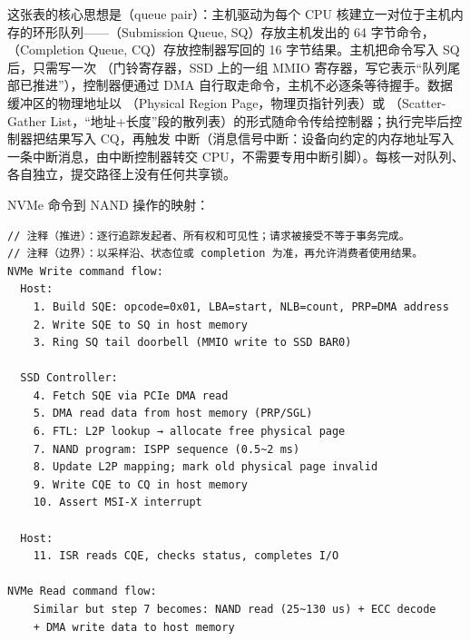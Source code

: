 这张表的核心思想是（queue pair）：主机驱动为每个 CPU 核建立一对位于主机内存的环形队列——（Submission Queue, SQ）存放主机发出的 64 字节命令，（Completion Queue, CQ）存放控制器写回的 16 字节结果。主机把命令写入 SQ 后，只需写一次 （门铃寄存器，SSD 上的一组 MMIO 寄存器，写它表示“队列尾部已推进”），控制器便通过 DMA 自行取走命令，主机不必逐条等待握手。数据缓冲区的物理地址以 （Physical Region Page，物理页指针列表）或 （Scatter-Gather List，“地址+长度”段的散列表）的形式随命令传给控制器；执行完毕后控制器把结果写入 CQ，再触发  中断（消息信号中断：设备向约定的内存地址写入一条中断消息，由中断控制器转交 CPU，不需要专用中断引脚）。每核一对队列、各自独立，提交路径上没有任何共享锁。

NVMe 命令到 NAND 操作的映射：

\begin{lstlisting}
// 注释（推进）：逐行追踪发起者、所有权和可见性；请求被接受不等于事务完成。
// 注释（边界）：以采样沿、状态位或 completion 为准，再允许消费者使用结果。
NVMe Write command flow:
  Host:
    1. Build SQE: opcode=0x01, LBA=start, NLB=count, PRP=DMA address
    2. Write SQE to SQ in host memory
    3. Ring SQ tail doorbell (MMIO write to SSD BAR0)

  SSD Controller:
    4. Fetch SQE via PCIe DMA read
    5. DMA read data from host memory (PRP/SGL)
    6. FTL: L2P lookup → allocate free physical page
    7. NAND program: ISPP sequence (0.5~2 ms)
    8. Update L2P mapping; mark old physical page invalid
    9. Write CQE to CQ in host memory
    10. Assert MSI-X interrupt

  Host:
    11. ISR reads CQE, checks status, completes I/O

NVMe Read command flow:
    Similar but step 7 becomes: NAND read (25~130 us) + ECC decode
    + DMA write data to host memory
\end{lstlisting}

